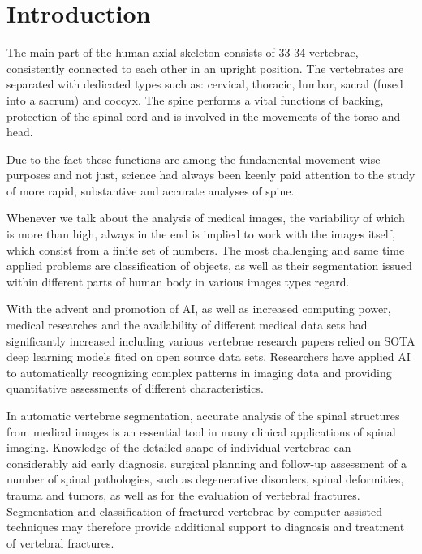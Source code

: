 \chapter{Introduction}
\label{ch:introduction}

The main part of the human axial skeleton consists of 33-34 vertebrae, consistently connected to each other in an upright position. The vertebrates are separated with dedicated types such as: cervical, thoracic, lumbar, sacral (fused into a sacrum) and coccyx. The spine performs a vital functions of backing, protection of the spinal cord and is involved in the movements of the torso and head.  
 
Due to the fact these functions are among the fundamental movement-wise purposes and not just, science had always been keenly paid attention to the study of more rapid, substantive and accurate analyses of spine.  
 
Whenever we talk about the analysis of medical images, the variability of which is more than high, always in the end is implied to work with the images itself, which consist from a finite set of numbers. The most challenging and same time applied problems are classification of objects, as well as their segmentation issued within different parts of human body in various images types regard.  
 
With the advent and promotion of AI, as well as increased computing power, medical researches and the availability of different medical data sets had significantly increased including various vertebrae research papers relied on SOTA deep learning models fited on open source data sets. Researchers have applied AI to automatically recognizing complex patterns in imaging data and providing quantitative assessments of different characteristics.  
 
In automatic vertebrae segmentation, accurate analysis of the spinal structures from medical images is an essential tool in many clinical applications of spinal imaging. Knowledge of the detailed shape of individual vertebrae can considerably aid early diagnosis, surgical planning and follow-up assessment of a number of spinal pathologies, such as degenerative disorders, spinal deformities, trauma and tumors, as well as for the evaluation of vertebral fractures. Segmentation and classification of fractured vertebrae by computer-assisted techniques may therefore provide additional support to diagnosis and treatment of vertebral fractures. 